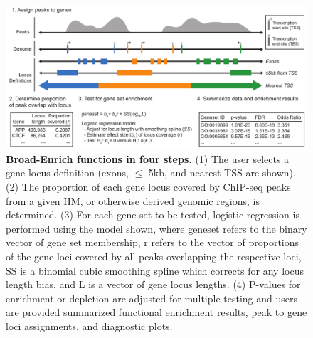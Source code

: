 \begin{figure}[ht!]
\centering
\includegraphics[width=1\textwidth]{chap2figs/figure2_1.pdf}
\caption[Broad-Enrich functions in four steps.]
{
\textbf{Broad-Enrich functions in four steps.}
(1) The user selects a gene locus definition (exons, $\leq$ 5kb, and nearest TSS are shown). (2) The proportion of each gene locus covered by ChIP-seq peaks from a given HM, or otherwise derived genomic regions, is determined. (3) For each gene set to be tested, logistic regression is performed using the model shown, where geneset refers to the binary vector of gene set membership, r refers to the vector of proportions of the gene loci covered by all peaks overlapping the respective loci, SS is a binomial cubic smoothing spline which corrects for any locus length bias, and L is a vector of gene locus lengths. (4) P-values for enrichment or depletion are adjusted for multiple testing and users are provided summarized functional enrichment results, peak to gene loci assignments, and diagnostic plots.
}
\label{chap2:fig:1}
\end{figure}

\newpage

